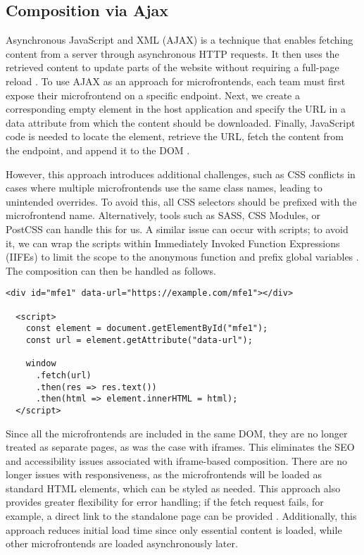 \subsection{Composition via Ajax}
Asynchronous JavaScript and XML (AJAX) is a technique that enables fetching content from a server through asynchronous HTTP requests. It then uses the retrieved content to update parts of the website without requiring a full-page reload \cite{Ajax}. To use AJAX as an approach for microfrontends, each team must first expose their microfrontend on a specific endpoint. Next, we create a corresponding empty element in the host application and specify the URL in a data attribute from which the content should be downloaded. Finally, JavaScript code is needed to locate the element, retrieve the URL, fetch the content from the endpoint, and append it to the DOM \cite{Geers}.

However, this approach introduces additional challenges, such as CSS conflicts in cases where multiple microfrontends use the same class names, leading to unintended overrides. To avoid this, all CSS selectors should be prefixed with the microfrontend name. Alternatively, tools such as SASS, CSS Modules, or PostCSS \cite{PostCSS} can handle this for us. A similar issue can occur with scripts; to avoid it, we can wrap the scripts within Immediately Invoked Function Expressions (IIFEs) to limit the scope to the anonymous function and prefix global variables \cite{Geers}. The composition can then be handled as follows.
\begin{lstlisting}[caption={Example of loading microfrontend using AJAX}]
  <div id="mfe1" data-url="https://example.com/mfe1"></div>
               
  <script>
    const element = document.getElementById("mfe1");
    const url = element.getAttribute("data-url");

    window
      .fetch(url)
      .then(res => res.text())
      .then(html => element.innerHTML = html);
  </script>
\end{lstlisting}
Since all the microfrontends are included in the same DOM, they are no longer treated as separate pages, as was the case with iframes. This eliminates the SEO and accessibility issues associated with iframe-based composition. There are no longer issues with responsiveness, as the microfrontends will be loaded as standard HTML elements, which can be styled as needed. This approach also provides greater flexibility for error handling; if the fetch request fails, for example, a direct link to the standalone page can be provided \cite{Geers}. Additionally, this approach reduces initial load time since only essential content is loaded, while other microfrontends are loaded asynchronously later.

